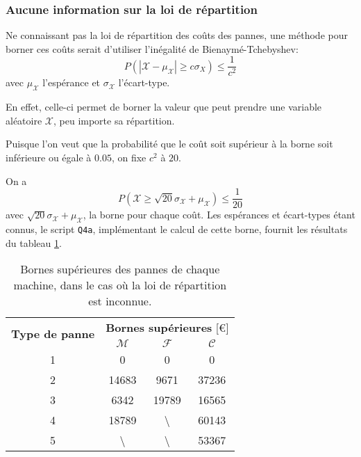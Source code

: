 \documentclass[a4paper, 12pt]{article}
\newcommand{\M}{\mathcal{M}}
\newcommand{\F}{\mathcal{F}}
\newcommand{\C}{\mathcal{C}}
\newcommand{\X}{\mathcal{X}}
\begin{document}
	\subsubsection{Aucune information sur la loi de répartition}
	\label{subsec:subsec_Q4a_i}
	Ne connaissant pas la loi de répartition des coûts des pannes, une méthode pour borner ces coûts serait d'utiliser l'inégalité de Bienaymé-Tchebyshev:
	\begin{displaymath}
	    P\left(\left|\X - \mu_\X\right|\geq c\sigma_{X}\right)\leq\dfrac{1}{c^2}
	\end{displaymath}
	avec \(\mu_\X\) l'espérance et \(\sigma_\X\) l'écart-type.\par
	En effet, celle-ci permet de borner la valeur que peut prendre une variable aléatoire \(\X\), peu importe sa répartition.\par
	Puisque l'on veut que la probabilité que le coût soit supérieur à la borne soit inférieure ou égale à \(\num{0.05}\), on fixe \(c^2\) à \(\num{20}\).\par
	On a
	\begin{displaymath}
	    P\left(\X\geq\sqrt{20}\sigma_\X + \mu_\X\right)\leq\dfrac{1}{20}
	\end{displaymath}
	avec \(\sqrt{20}\sigma_\X + \mu_\X\), la borne pour chaque coût. Les espérances et écart-types étant connus, le script \texttt{Q4a}, implémentant le calcul de cette borne, fournit les résultats du tableau \ref{tab:tab_Q4a_i}.\par
	\begin{table}[!ht]
	    \centering
	    \begin{tabular}{|c|c|c|c|}
	        \hline
	        \multirow{2}{*}{\textbf{Type de panne}} & \multicolumn{3}{c|}{\textbf{Bornes supérieures} [\euro{}]}\\ \cline{2-4}
	        & \(\bm{\M}\) & \(\bm{\F}\) & \(\bm{\C}\)\\
	        \hline
	        \hline
	        1 & \num{0} & \num{0} & \num{0}\\
	        \hline
	        2 & \num{14683} & \num{9671} & \num{37236}\\
	        \hline
	        3 & \num{6342} & \num{19789} & \num{16565}\\
	        \hline
	        4 & \num{18789} & \textbackslash & \num{60143}\\
	        \hline
	        5 & \textbackslash & \textbackslash & \num{53367}\\
	        \hline
	    \end{tabular}
	    \caption{Bornes supérieures des pannes de chaque machine, dans le cas où la loi de répartition est inconnue.}
	    \label{tab:tab_Q4a_i}
	\end{table}
\end{document}
